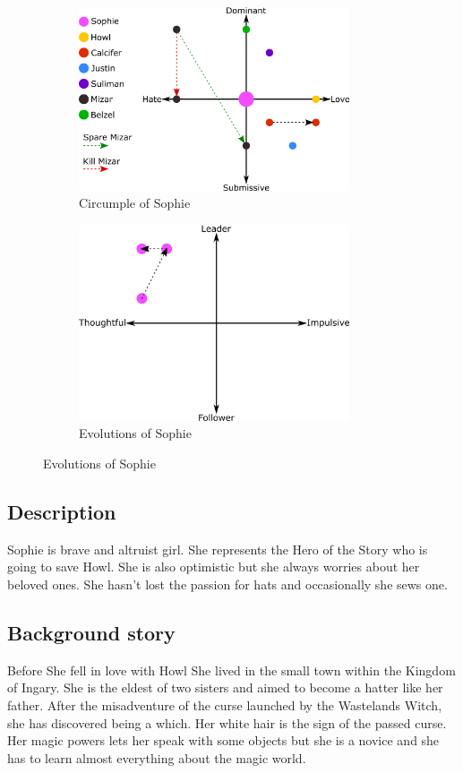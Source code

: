 \begin{figure}
\centering
\begin{subfigure}
  \centering
  \includegraphics[width=8cm]{Images/Circumplexes/sophieCircumplex}
  \caption{Circumple of Sophie}
\end{subfigure}
\begin{subfigure}
  \centering
   \includegraphics[width=8cm]{Images/Evolutions/sophieEvolution}
  \caption{Evolutions of Sophie}
\end{subfigure}
\end{figure}

\subsection{Description}
Sophie is brave and altruist girl. She represents the Hero of the Story who is going to save Howl. She is also optimistic but she always worries about her beloved ones. She hasn’t lost the passion for hats and occasionally she sews one.

\subsection{Background story}
Before She fell in love with Howl She lived in the small town within the Kingdom of Ingary. She is the eldest of two sisters and aimed to become a hatter like her father. After the misadventure of the curse launched by the Wastelands Witch, she has discovered being a which. Her white hair is the sign of the passed curse. Her magic powers lets her speak with some objects but she is a novice and she has to learn almost everything about the magic world.

